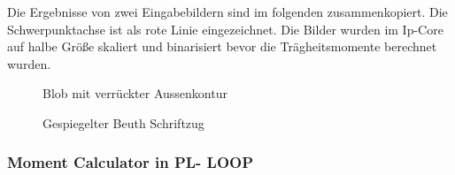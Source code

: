 \documentclass[a4paper]{report}
\begin{document}
Die Ergebnisse von zwei Eingabebildern sind im folgenden zusammenkopiert. Die Schwerpunktachse ist als rote Linie eingezeichnet. Die Bilder wurden im Ip-Core auf halbe Größe skaliert und binarisiert bevor die Trägheitsmomente berechnet wurden.

\begin{figure}[H]
\centering
{}
\caption{Blob mit verrückter Aussenkontur}
\label{fig:blob1}
\end{figure}

\begin{figure}[H]
\centering
{}
\caption{Gespiegelter Beuth Schriftzug}
\label{fig:blob2}
\end{figure}

\subsubsection{Moment Calculator in PL- LOOP}
\end{document}
